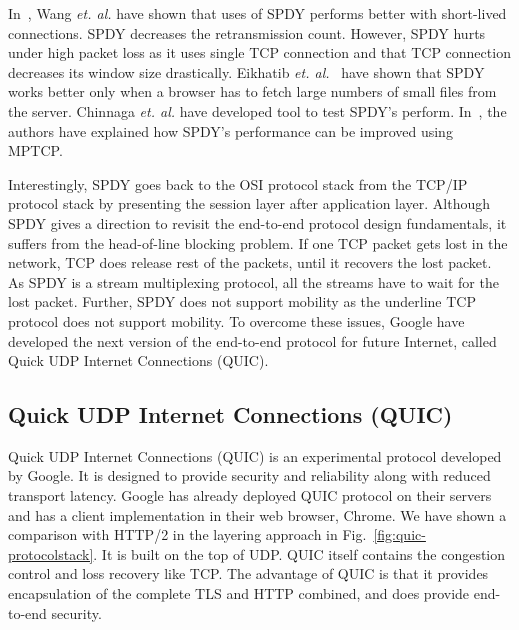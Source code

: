 In~\cite{howspeedis}, Wang \textit{et. al.} have shown that uses of SPDY performs better with short-lived connections. SPDY decreases the retransmission count. However, SPDY hurts under high packet loss as it uses single TCP connection and that TCP connection decreases its window size drastically.  Eikhatib \textit{et. al.}~\cite{canspdymake} have shown that SPDY works better only when a browser has to fetch large numbers of small files from the server. Chinnaga \textit{et. al.}\cite{scalabilitySPDY} have developed tool to test SPDY's perform. In~\cite{han2015anatomy}, the authors have explained how SPDY's performance can be improved using MPTCP.

Interestingly, SPDY goes back to the OSI protocol stack from the TCP/IP protocol stack by presenting the session layer after application layer. Although SPDY gives a direction to revisit the end-to-end protocol design fundamentals, it suffers from the head-of-line blocking problem. If one TCP packet gets lost in the network, TCP does release rest of the packets, until it recovers the lost packet. As SPDY is a stream multiplexing protocol, all the streams have to wait for the lost packet. Further, SPDY does not support mobility as the underline TCP protocol does not support mobility. To overcome these issues, Google have developed the next version of the end-to-end protocol for future Internet, called Quick UDP Internet Connections (QUIC).

\subsection{Quick UDP Internet Connections (QUIC)}
Quick UDP Internet Connections (QUIC) is an experimental protocol developed by Google. It is designed to provide
security and reliability along with reduced transport latency. Google has already deployed QUIC protocol on their servers and has a client implementation in their web browser, Chrome. We have shown a comparison with HTTP/2 in the layering approach in Fig.~\ref{fig:quic-protocolstack}. It is built on the top of UDP. QUIC itself contains the congestion control and loss recovery like TCP. The advantage of QUIC is that it provides encapsulation of the complete TLS and HTTP combined, and does provide end-to-end security.

